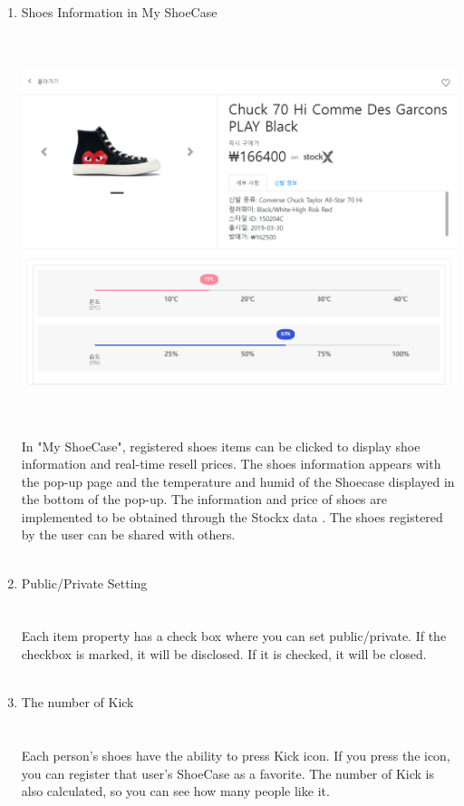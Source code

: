 \documentclass[conference]{IEEEtran}
\begin{document}
\begin{enumerate}
	\item Shoes Information in My ShoeCase\\\\
\\\centerline{\includegraphics[scale=0.33]{pics/mycase_info.png}}
\\\\In "My ShoeCase", registered shoes items can be clicked to display shoe information and real-time resell prices. The shoes information appears with the pop-up page and the temperature and humid of the Shoecase displayed in the bottom of the pop-up.
The information and price of shoes are implemented to be obtained through the Stockx data . The shoes registered by the user can be shared with others.\\\\
	\item Public/Private Setting\\\\
\\Each item property has a check box where you can set public/private. 
If the checkbox is marked, it will be disclosed. If it is checked, it will be closed.\\\\
	\item The number of Kick\\\\
\\Each person's shoes have the ability to press Kick icon. 
If you press the icon, you can register that user's ShoeCase as a favorite.
The number of Kick is also calculated, so you can see how many people like it.\\\\
\end{enumerate}
\end{document}
